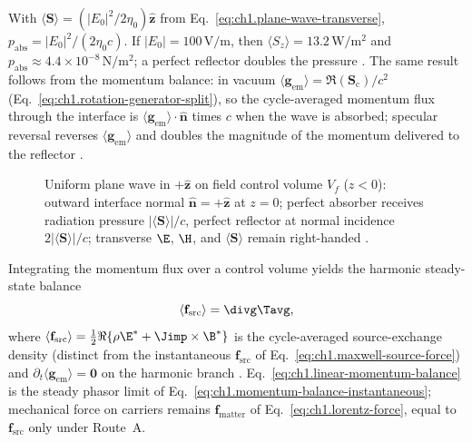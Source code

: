 \begin{example}
\label{ex:ch1.radiation-pressure}
With $\langle\mathbf{S}\rangle=(|E_0|^2/2\eta_0)\hat{\mathbf{z}}$ from Eq.~\eqref{eq:ch1.plane-wave-transverse}, $p_{\mathrm{abs}}=|E_0|^2/(2\eta_0 c)$. If $|E_0|=100\,\mathrm{V/m}$, then $\langle S_z\rangle=13.2\,\mathrm{W/m^2}$ and $p_{\mathrm{abs}}\approx4.4\times10^{-8}\,\mathrm{N/m^2}$; a perfect reflector doubles the pressure \cite{stratton1941}. The same result follows from the momentum balance: in vacuum $\langle\mathbf{g}_{\mathrm{em}}\rangle=\Re(\mathbf{S}_\mathrm{c})/c^2$ (Eq.~\eqref{eq:ch1.rotation-generator-split}), so the cycle-averaged momentum flux through the interface is $\langle\mathbf{g}_{\mathrm{em}}\rangle\cdot\hat{\mathbf{n}}$ times $c$ when the wave is absorbed; specular reversal reverses $\langle\mathbf{g}_{\mathrm{em}}\rangle$ and doubles the magnitude of the momentum delivered to the reflector \cite{stratton1941}.
\end{example}

\begin{figure}[t]
\centering
\VolIPhysFig{\VolIPhysPlaneWaveRadiationPressure}
\caption{Uniform plane wave in $+\hat{\mathbf{z}}$ on field control volume $V_f$ ($z<0$): outward interface normal $\hat{\mathbf{n}}=+\hat{\mathbf{z}}$ at $z=0$; perfect absorber receives radiation pressure $|\langle\mathbf{S}\rangle|/c$, perfect reflector at normal incidence $2|\langle\mathbf{S}\rangle|/c$; transverse $\E$, $\H$, and $\langle\mathbf{S}\rangle$ remain right-handed \cite{stratton1941,maxwell1873}.}
\label{fig:ch1.plane-wave-handedness}
\end{figure}
Integrating the momentum flux over a control volume yields the harmonic steady-state balance
\begin{equation}
\label{eq:ch1.linear-momentum-balance}
\langle\mathbf{f}_{\mathrm{src}}\rangle=\divg\Tavg,
\end{equation}
where \(\langle\mathbf{f}_{\mathrm{src}}\rangle=\tfrac12\Re\{\rho\E^*+\Jimp\times\B^*\}\) is the cycle-averaged source-exchange density (distinct from the instantaneous \(\mathbf{f}_{\mathrm{src}}\) of Eq.~\eqref{eq:ch1.maxwell-source-force}) and \(\partial_t\langle\mathbf{g}_{\mathrm{em}}\rangle=\mathbf{0}\) on the harmonic branch \cite{stratton1941}. Eq.~\eqref{eq:ch1.linear-momentum-balance} is the steady phasor limit of Eq.~\eqref{eq:ch1.momentum-balance-instantaneous}; mechanical force on carriers remains \(\mathbf{f}_{\mathrm{matter}}\) of Eq.~\eqref{eq:ch1.lorentz-force}, equal to \(\mathbf{f}_{\mathrm{src}}\) only under Route~A.

